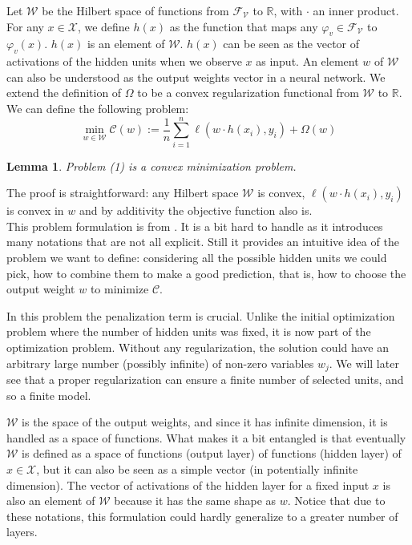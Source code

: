 \documentclass[a4paper, 11pt]{scrartcl}
\newtheorem{lemma}[theorem]{Lemma}
\begin{document}
{Let $\mathcal{W}$ be the Hilbert space of functions from $\mathcal{F}_\mathcal{V}$ to $\mathbb{R}$, with $\cdot$ an inner product. For any $x \in \mathcal{X}$, we define $h(x)$ as the function that maps any $\varphi_v \in \mathcal{F}_\mathcal{V}$ to $\varphi_v(x)$. $h(x)$ is an element of $\mathcal{W}$. $h(x)$ can be seen as the vector of activations of the hidden units when we observe $x$ as input. An element $w$ of $\mathcal{W}$ can also be understood as the output weights vector in a neural network. We extend the definition of $\Omega$ to be a convex regularization functional from $\mathcal{W}$ to $\mathbb{R}$.  \\

We can define the following problem:
\begin{equation}
\min_{w \in \mathcal{W}} \mathcal{C}(w) := \frac{1}{n} \sum_{i=1}^n \ell(w \cdot h(x_i), y_i) + \Omega(w)
\end{equation}

\begin{lemma}
Problem (1) is a convex minimization problem.
\end{lemma}
The proof is straightforward: any Hilbert space $\mathcal{W}$ is convex, $ \ell(w \cdot h(x_i), y_i)$ is convex in $w$ and by additivity the objective function also is.\\

This problem formulation is from \cite{bengio2006convex}. It is a bit hard to handle as it introduces many notations that are not all explicit. Still it provides an intuitive idea of the problem we want to define: considering all the possible hidden units we could pick, how to combine them to make a good prediction, that is, how to choose the output weight $w$ to minimize $\mathcal{C}$. 

In this problem the penalization term is crucial. Unlike the initial optimization problem where the number of hidden units was fixed, it is now part of the optimization problem. Without any regularization, the solution could have an arbitrary large number (possibly infinite) of non-zero variables $w_j$. We will later see that a proper regularization can ensure a finite number of selected units, and so a finite model.

$\mathcal{W}$ is the space of the output weights, and since it has infinite dimension, it is handled as a space of functions. What makes it a bit entangled is that eventually $\mathcal{W}$ is defined as a space of functions (output layer) of functions (hidden layer) of $x\in \mathcal{X}$, but it can also be seen as a simple vector (in potentially infinite dimension). The vector of activations of the hidden layer for a fixed input $x$ is also an element of $\mathcal{W}$ because it has the same shape as $w$. Notice that due to these notations, this formulation could hardly  generalize to a greater number of layers.\\

}
\end{document}

